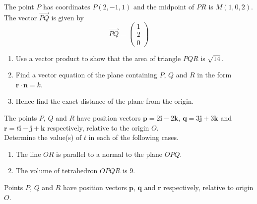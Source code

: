 \documentclass[leqno]{article}
\begin{document}
\begin{enumerate}[
  label=\textbf{\arabic*.},
  leftmargin=*,
  topsep=0pt,
  partopsep=0pt,
  parsep=0pt
]
\newpage


\questionitem

The point $P$ has coordinates $P(2,-1,1)$ and the midpoint of $PR$ is $M(1,0,2)$. The vector $\overrightarrow{PQ}$ is given by
\[
\overrightarrow{PQ}=\begin{pmatrix}1\\2\\0\end{pmatrix}
\]

\begin{enumerate}[label=\textbf{(\alph*)}]
  \item Use a vector product to show that the area of triangle $PQR$ is $\sqrt{14}$.  \\
  \item Find a vector equation of the plane containing $P$, $Q$ and $R$ in the form $\mathbf{r} \cdot \mathbf{n} = k$.  \\
  \item Hence find the exact distance of the plane from the origin.  \\
\end{enumerate}
\newpage


\questionitem

The points $P$, $Q$ and $R$ have position vectors $\mathbf{p}=2\mathbf{i}-2\mathbf{k}$, $\mathbf{q}=3\mathbf{j}+3\mathbf{k}$ and $\mathbf{r}=t\mathbf{i}-\mathbf{j}+\mathbf{k}$ respectively, relative to the origin $O$. \\

Determine the value(s) of $t$ in each of the following cases. \\

\begin{enumerate}[label=\textbf{(\alph*)}]
  \item The line $OR$ is parallel to a normal to the plane $OPQ$.  \\
  \item The volume of tetrahedron $OPQR$ is $9$.  \\
\end{enumerate}

\newpage

\questionitem

Points $P$, $Q$ and $R$ have position vectors $\mathbf{p}$, $\mathbf{q}$ and $\mathbf{r}$ respectively, relative to origin $O$. \\


\end{enumerate}
\end{document}
